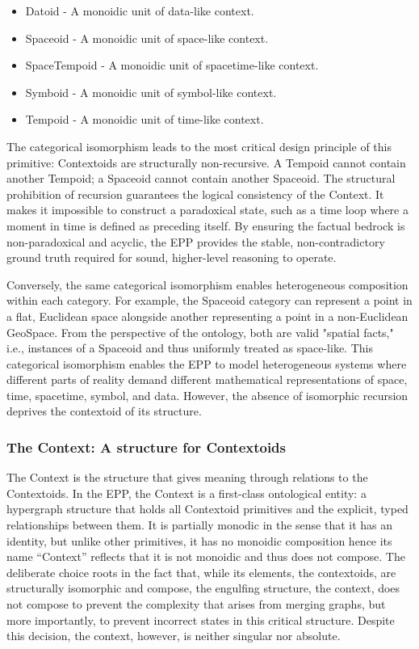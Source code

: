 \begin{itemize}
	\item Datoid -  A monoidic unit of data-like context. 
	\item Spaceoid - A monoidic unit of space-like context.
	\item SpaceTempoid - A monoidic unit of spacetime-like context.
	\item Symboid -  A monoidic unit of symbol-like context.
	\item Tempoid -  A monoidic unit of time-like context.
\end{itemize}

The categorical isomorphism leads to the most critical design principle of this primitive: Contextoids are structurally non-recursive. A Tempoid cannot contain another Tempoid; a Spaceoid cannot contain another Spaceoid. The structural prohibition of recursion guarantees the logical consistency of the Context. It makes it impossible to construct a paradoxical state, such as a time loop where a moment in time is defined as preceding itself. By ensuring the factual bedrock is non-paradoxical and acyclic, the EPP provides the stable, non-contradictory ground truth required for sound, higher-level reasoning to operate. 

Conversely, the same categorical isomorphism enables heterogeneous composition within each category. For example, the Spaceoid category can represent a point in a flat, Euclidean space alongside another representing a point in a non-Euclidean GeoSpace. From the perspective of the ontology, both are valid "spatial facts," i.e., instances of a Spaceoid and thus uniformly treated as space-like. This categorical isomorphism enables the EPP to model heterogeneous systems where different parts of reality demand different mathematical representations of space, time, spacetime, symbol, and data. However, the absence of 
isomorphic recursion deprives the contextoid of its structure. 


\subsubsection{The Context: A structure for Contextoids}
\label{sec:ontology_context}


The Context is the structure that gives meaning through relations to the Contextoids. In the EPP, the Context is a first-class ontological entity: a hypergraph structure that holds all Contextoid primitives and the explicit, typed relationships between them. It is partially monodic in the sense that it has an identity, but unlike other primitives, it has no monoidic composition hence its name “Context” reflects that it is not monoidic and thus does not compose. The deliberate choice roots in the fact that, while its elements, the contextoids, are structurally isomorphic and compose, the engulfing structure, the context, does not compose to prevent the complexity that arises from merging graphs, but more importantly, to prevent incorrect states in this critical structure. Despite this decision, the context, however, is neither singular nor absolute. 

